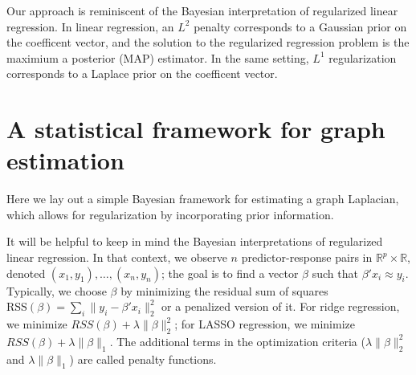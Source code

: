 \documentclass[12pt]{article}
\newcommand{\reals}{\mathbb{R}}
\theoremstyle{plain}
\begin{document}
Our approach is reminiscent of the Bayesian interpretation of
regularized linear regression.  In linear regression, an $L^2$ penalty
corresponds to a Gaussian prior on the coefficent vector, and the
solution to the regularized regression problem is the maximium a
posterior (MAP) estimator.  In the same setting, $L^1$ regularization
corresponds to a Laplace prior on the coefficent vector.


\section{A statistical framework for graph estimation}

Here we lay out a simple Bayesian framework for estimating a graph
Laplacian, which allows for regularization by incorporating prior
information.

It will be helpful to keep in mind the Bayesian
interpretations of regularized linear regression.  In that context, we
observe $n$ predictor-response pairs in $\reals^p \times \reals$,
denoted $(x_1, y_1), \dotsc, (x_n, y_n)$; the goal is to find a vector
$\beta$ such that $\beta' x_i \approx y_i$.  Typically, we choose
$\beta$ by minimizing the residual sum of squares
$\mathrm{RSS}(\beta) = \sum_i \| y_i - \beta' x_i \|_2^2$ or a
penalized version of it.  For ridge regression, we minimize
$RSS(\beta) + \lambda \|\beta\|_2^2$; for LASSO regression, we minimize
$RSS(\beta) + \lambda \|\beta\|_1$.  The additional terms in the
optimization criteria ($\lambda \|\beta\|_2^2$ and $\lambda
\|\beta\|_1$) are called penalty functions.
\end{document}
